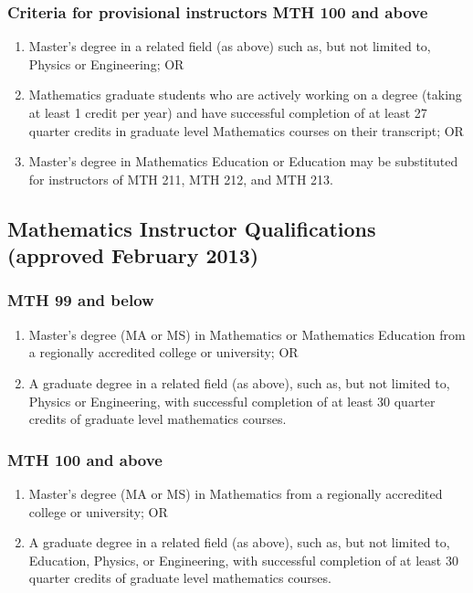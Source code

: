 \subsubsection{Criteria for provisional instructors MTH 100 and above }
\begin{enumerate}
  \item Master's degree in a related field (as above) such as, but not limited to, Physics or Engineering; OR
  \item Mathematics graduate students who are actively working on a degree (taking at least 1 credit per year) and have successful completion of at least 27 quarter credits in graduate level Mathematics courses on their transcript; OR
  \item Master's degree in Mathematics Education or Education may be substituted for instructors of MTH 211, MTH 212, and MTH 213.
\end{enumerate}
\subsection{Mathematics Instructor Qualifications (approved February 2013)}
\subsubsection{MTH 99 and below}
\begin{enumerate}
  \item Master's degree (MA or MS) in Mathematics or Mathematics Education from a regionally accredited college or university; OR
  \item A graduate degree in a related field (as above), such as, but not limited to, Physics or Engineering, with successful completion of at least 30 quarter credits of graduate level mathematics courses.
\end{enumerate}
\subsubsection{MTH 100 and above}
\begin{enumerate}
  \item  Master's degree (MA or MS) in Mathematics from a regionally accredited college or university; OR
  \item A graduate degree in a related field (as above), such as, but not limited to, Education, Physics, or Engineering, with successful completion of at least 30 quarter credits of graduate level mathematics courses.
\end{enumerate}
